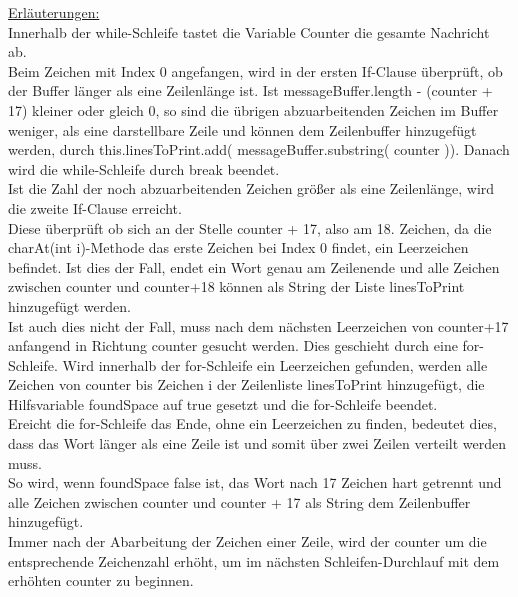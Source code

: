 \underline{Erläuterungen:}\\
Innerhalb der while-Schleife tastet die Variable Counter die gesamte Nachricht ab.\\
Beim Zeichen mit Index 0 angefangen, wird in der ersten If-Clause überprüft, ob der Buffer länger als eine Zeilenlänge ist.
Ist messageBuffer.length - (counter + 17) kleiner oder gleich 0, so sind die übrigen abzuarbeitenden Zeichen im Buffer weniger, als eine darstellbare Zeile und können dem Zeilenbuffer hinzugefügt werden, durch this.linesToPrint.add( messageBuffer.substring( counter )). Danach wird die while-Schleife durch break beendet.\\
Ist die Zahl der noch abzuarbeitenden Zeichen größer als eine Zeilenlänge, wird die zweite If-Clause erreicht.\\
Diese überprüft ob sich an der Stelle counter + 17, also am 18. Zeichen, da die charAt(int i)-Methode das erste Zeichen bei Index 0 findet, ein Leerzeichen befindet. Ist dies der Fall, endet ein Wort genau am Zeilenende und alle Zeichen zwischen counter und counter+18 können als String der Liste linesToPrint hinzugefügt werden.\\
Ist auch dies nicht der Fall, muss nach dem nächsten Leerzeichen von counter+17 anfangend in Richtung counter gesucht werden.
Dies geschieht durch eine for-Schleife.
Wird innerhalb der for-Schleife ein Leerzeichen gefunden, werden alle Zeichen von counter bis Zeichen i der Zeilenliste linesToPrint hinzugefügt, die Hilfsvariable foundSpace auf true gesetzt und die for-Schleife beendet.\\
Ereicht die for-Schleife das Ende, ohne ein Leerzeichen zu finden, bedeutet dies, dass das Wort länger als eine Zeile ist und somit über zwei Zeilen verteilt werden muss.\\
So wird, wenn foundSpace false ist, das Wort nach 17 Zeichen hart getrennt und alle Zeichen zwischen counter und counter + 17 als String dem Zeilenbuffer hinzugefügt.\\
Immer nach der Abarbeitung der Zeichen einer Zeile, wird der counter um die entsprechende Zeichenzahl erhöht, um im nächsten Schleifen-Durchlauf mit dem erhöhten counter zu beginnen.

